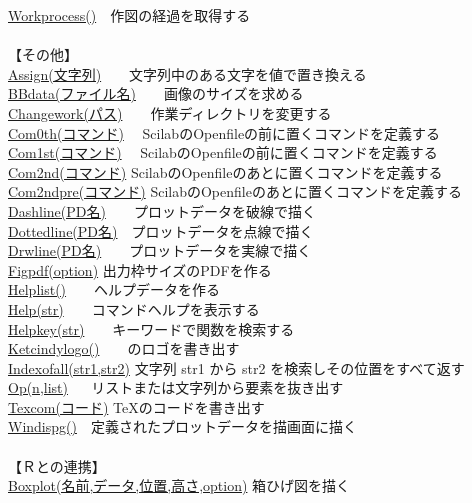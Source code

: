 \documentclass[papersize,a4paper,12pt,uplatex]{jsarticle}
\begin{document}
\begin{tabbing}
 \hyperlink{workprocess}{Workprocess()}　\>作図の経過を取得する\\
　\\
【その他】\\
\hyperlink{assign}{Assign(文字列)}　　\>文字列中のある文字を値で置き換える\\
\hyperlink{bbdata}{BBdata(ファイル名)}　　\>画像のサイズを求める\\
\hyperlink{changework}{Changework(パス)}　　\>作業ディレクトリを変更する\\
\hyperlink{com0th}{Com0th(コマンド)} 　\>ScilabのOpenfileの前に置くコマンドを定義する\\
\hyperlink{com1st}{Com1st(コマンド)} 　\>ScilabのOpenfileの前に置くコマンドを定義する\\
\hyperlink{com2nd}{Com2nd(コマンド)} \>ScilabのOpenfileのあとに置くコマンドを定義する\\
\hyperlink{com2ndpre}{Com2ndpre(コマンド)} \>ScilabのOpenfileのあとに置くコマンドを定義する\\
\hyperlink{dashline}{Dashline(PD名)}　　\>プロットデータを破線で描く\\
\hyperlink{dottedline}{Dottedline(PD名)}　\>プロットデータを点線で描く\\
\hyperlink{drwline}{Drwline(PD名)}　　\>プロットデータを実線で描く\\
\hyperlink{figpdf}{Figpdf(option)} \>出力枠サイズのPDFを作る\\
\hyperlink{helplist}{Helplist()}　　\>ヘルプデータを作る\\
\hyperlink{help}{Help(str)}　　\>コマンドヘルプを表示する\\
\hyperlink{helpkey}{Helpkey(str)}　　\>キーワードで関数を検索する\\
\hyperlink{help}{Ketcindylogo()}　　\>\ketcindy のロゴを書き出す\\
\hyperlink{indexall}{Indexofall(str1,str2)} \>文字列 str1 から str2 を検索しその位置をすべて返す\\
\hyperlink{op}{Op(n,list)} 　\> リストまたは文字列から要素を抜き出す\\
\hyperlink{texcom}{Texcom(コード)} \>\TeX のコードを書き出す\\
\hyperlink{windispg}{Windispg()}　\>定義されたプロットデータを描画面に描く\\
　\\
【Ｒとの連携】\\
\hyperlink{boxplot}{Boxplot(名前,データ,位置,高さ,option)} \>箱ひげ図を描く\\

\end{tabbing}
\end{document}
